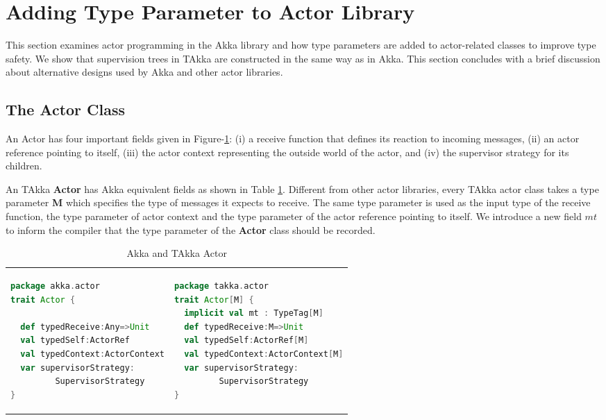 \section{Adding Type Parameter to Actor Library}

This section examines actor programming in the Akka library and how type parameters are added to actor-related classes to improve type safety.  We show that supervision trees in TAkka are constructed in the same way as in Akka.  This section concludes with a brief discussion about alternative designs used by Akka and other actor libraries.


\subsection{The Actor Class}

An Actor has four important fields given in Figure-\ref{actor_api}:
(i) a receive function that defines its reaction to incoming messages, (ii)
an actor reference pointing to  itself, (iii) the actor  context representing
the outside world of the actor, and (iv) the supervisor strategy for its
children.


An TAkka {\bf Actor} has Akka equivalent fields as shown in
Table \ref{actor_api}.  Different from other actor libraries, every TAkka
actor class takes a type parameter {\bf M} which specifies the type of messages
it expects to receive.  The same type parameter is used as the input type of the
receive function, the type parameter of actor context and the type parameter of
the actor reference pointing to itself.  We introduce a new field $mt$ to inform the compiler that the type parameter of the {\bf Actor} class should be recorded.

\begin{table}[h]
\label{actor_api}
\caption{Akka and TAkka Actor}
  \begin{tabular}{ l   l }
\begin{lstlisting}[language=scala]
package akka.actor
trait Actor {

  def typedReceive:Any=>Unit
  val typedSelf:ActorRef
  val typedContext:ActorContext
  var supervisorStrategy:
         SupervisorStrategy
}
\end{lstlisting} &
\begin{lstlisting}[language=scala]
package takka.actor
trait Actor[M] {
  implicit val mt : TypeTag[M]
  def typedReceive:M=>Unit
  val typedSelf:ActorRef[M]
  val typedContext:ActorContext[M]
  var supervisorStrategy: 
         SupervisorStrategy
}
\end{lstlisting}
  \end{tabular}
\end{table}



